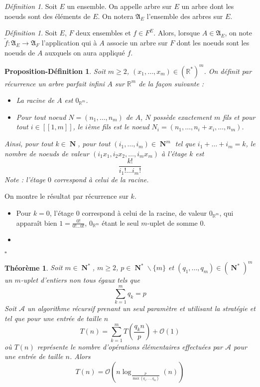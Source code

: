 \documentclass[a4paper,12pt,reqno]{amsart}
\newtheorem{prevtheorem}{Théorème}
\newtheorem{propdef}[theorem]{Proposition-Définition}
\theoremstyle{remark}
\newtheorem{définition}[theorem]{Définition}
\numberwithin{equation}{section}
\DeclareMathOperator{\N}{\mathbf{N}}
\newcommand{\R}{\mathbb{R}}
\renewcommand{\geq}{\geqslant}
\renewenvironment{proof}{{\textit{Preuve} }}{\hfill $\square$ \\}
\begin{document}
\begin{définition}
Soit $E$ un ensemble. On appelle arbre sur $E$ un arbre dont les noeuds sont des éléments de $E$. On notera $\mathfrak A_E$ l'ensemble des arbres sur $E$.
\end{définition}

\begin{définition}
Soit $E$, $F$ deux ensembles et $f\in F^E$. Alors, lorsque $A\in \mathfrak A_E$, on note $\tilde{f}:\mathfrak A_E\to\mathfrak A_F$ l'application qui à $A$ associe un arbre sur $F$ dont les noeuds sont les noeuds de $A$ auxquels on aura appliqué $f$.
\end{définition}

\begin{propdef}
Soit $m\geq 2$, $(x_1,\dots,x_m)\in(\R^*)^m$. On définit par récurrence un arbre parfait infini $A$ sur $\R^m$ de la façon suivante :
\begin{itemize}
	\item La racine de $A$ est $0_{\R^m}$.
	\item Pour tout noeud $N=(n_1,\dots,n_m)$ de $A$, $N$ possède exactement $m$ fils et pour tout $i\in[\![1,m]\!]$, le $i$ème fils est le noeud $N_i=(n_1,\dots,n_i+x_i,\dots,n_m)$.
\end{itemize}
Ainsi, pour tout $k\in\N$, pour tout $(i_1,\dots,i_m)\in\N^m$ tel que $i_1+\dots+i_m=k$, le nombre de noeuds de valeur $(i_1x_1,i_2x_2,\dots,i_mx_m)$ à l'étage $k$ est \[\frac{k!}{i_1!\dots i_m!}\]
Note : l'étage $0$ correspond à celui de la racine.
\end{propdef}

\begin{proof}
On montre le résultat par récurrence sur $k$.
\begin{itemize}
	\item Pour $k=0$, l'étage $0$ correspond à celui de la racine, de valeur $0_{\R^m}$, qui apparaît bien $1=\frac{0!}{0!\dots 0!}$, $0_{\R^m}$ étant le seul $m$-uplet de somme $0$.
	\item 
\end{itemize}
\end{proof}

\begin{prevtheorem}\label{Thm:A}
	Soit $m\in\N^*$, $m\geq 2$, $p\in \N^*\backslash\lbrace m\rbrace$ et $(q_1,\dots,q_m)\in(\N^*)^m$ un $m$-uplet d'entiers non tous égaux tels que \[\sum_{k=1}^mq_k=p\]
	Soit $\mathcal A$ un algorithme récursif prenant un seul paramètre et utilisant la stratégie  et tel que pour une entrée de taille $n$ \[T(n)=\sum_{k=1}^mT\left(\frac{q_kn}p\right)+\mathcal O(1)\]
	où $T(n)$ représente le nombre d'opérations élémentaires effectuées par $\mathcal A$ pour une entrée de taille $n$. Alors \[T(n)=\mathcal O\left(n\log_{\frac{p}{\max(q_1,\dots,q_m)}}(n)\right)\]
\end{prevtheorem}
\end{document}
